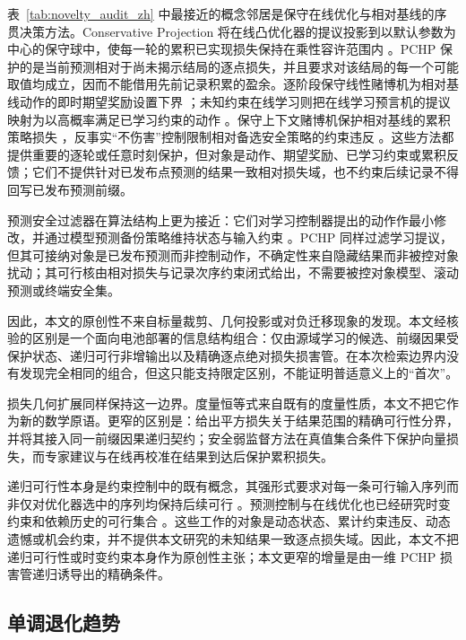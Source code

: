 \documentclass[UTF8,11pt]{ctexart}
\begin{document}
表~\ref{tab:novelty_audit_zh} 中最接近的概念邻居是保守在线优化与相对基线的序贯决策方法。Conservative Projection 将在线凸优化器的提议投影到以默认参数为中心的保守球中，使每一轮的累积已实现损失保持在乘性容许范围内 \citep{bernasconi2021conservative}。PCHP 保护的是当前预测相对于尚未揭示结局的逐点损失，并且要求对该结局的每一个可能取值均成立，因而不能借用先前记录积累的盈余。逐阶段保守线性赌博机为相对基线动作的即时期望奖励设置下界 \citep{moradipari2020stagewise}；未知约束在线学习则把在线学习预言机的提议映射为以高概率满足已学习约束的动作 \citep{sridharan2025unknown}。保守上下文赌博机保护相对基线的累积策略损失 \citep{deb2025conservative}，反事实“不伤害”控制限制相对备选安全策略的约束违反 \citep{vaskov2024donoharm}。这些方法都提供重要的逐轮或任意时刻保护，但对象是动作、期望奖励、已学习约束或累积反馈；它们不提供针对已发布点预测的结果一致相对损失域，也不约束后续记录不得回写已发布预测前缀。

预测安全过滤器在算法结构上更为接近：它们对学习控制器提出的动作作最小修改，并通过模型预测备份策略维持状态与输入约束 \citep{wabersich2021predictive}。PCHP 同样过滤学习提议，但其可接纳对象是已发布预测而非控制动作，不确定性来自隐藏结果而非被控对象扰动；其可行核由相对损失与记录次序约束闭式给出，不需要被控对象模型、滚动预测或终端安全集。

因此，本文的原创性不来自标量裁剪、几何投影或对负迁移现象的发现。本文经核验的区别是一个面向电池部署的信息结构组合：仅由源域学习的候选、前缀因果受保护状态、递归可行非增输出以及精确逐点绝对损失损害管。在本次检索边界内没有发现完全相同的组合，但这只能支持限定区别，不能证明普适意义上的“首次”。

损失几何扩展同样保持这一边界。度量恒等式来自既有的度量性质，本文不把它作为新的数学原语。更窄的区别是：给出平方损失关于结果范围的精确可行性分界，并将其接入同一前缀因果递归契约；安全弱监督方法在真值集合条件下保护向量损失，而专家建议与在线再校准在结果到达后保护累积损失。

递归可行性本身是约束控制中的既有概念，其强形式要求对每一条可行输入序列而非仅对优化器选中的序列均保持后续可行 \citep{lofberg2012oops}。预测控制与在线优化也已经研究时变约束和依赖历史的可行集合 \citep{li2021information,garber2024projectionfree,knaup2026recursively}。这些工作的对象是动态状态、累计约束违反、动态遗憾或机会约束，并不提供本文研究的未知结果一致逐点损失域。因此，本文不把递归可行性或时变约束本身作为原创性主张；本文更窄的增量是由一维 PCHP 损害管递归诱导出的精确条件。

\subsection{单调退化趋势}
\end{document}
